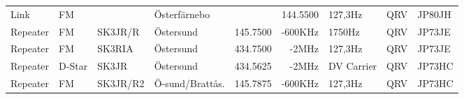 \begin{landscape}
\begin{longtable}{llllrrlcl}
	Link                      & FM            &               & Österfärnebo        &                   & 144.5500       & 127,3Hz          & QRV             & JP80JH           \\
	Repeater                  & FM            & SK3JR/R       & Östersund           & 145.7500          & -600KHz        & 1750Hz           & QRV             & JP73JE           \\
	Repeater                  & FM            & SK3RIA        & Östersund           & 434.7500          & -2MHz          & 127,3Hz          & QRV             & JP73JE           \\
	Repeater                  & D-Star        & SK3JR         & Östersund           & 434.5625          & -2MHz          & DV Carrier       & QRV             & JP73HC           \\
	Repeater                  & FM            & SK3JR/R2      & Ö-sund/Brattås.     & 145.7875          & -600KHz        & 127,3Hz          & QRV             & JP73HC
\end{longtable}
\normalsize

\end{landscape}
